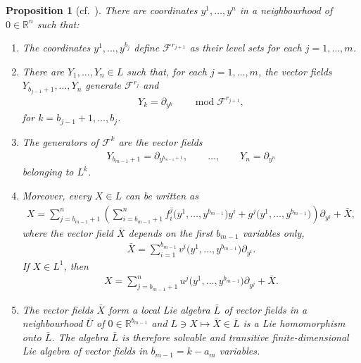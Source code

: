 \documentclass[pdftex]{sigma}
\numberwithin{equation}{section}
\newtheorem{Proposition}[Theorem]{Proposition}
 { \theoremstyle{definition}
\newtheorem{Definition}[Theorem]{Definition}
\newtheorem{Example}[Theorem]{Example}
\newtheorem{Remark}[Theorem]{Remark} }
\begin{document}
\begin{Proposition}[cf.~\cite{CFG16, CFGR15}]\label{p1}
There are coordinates $y^1,\dots,y^n$ in a neighbourhood of $0\in{\mathbb R}^n$ such that:
\begin{enumerate}\itemsep=0pt
\item[$1.$] The coordinates $y^1,\dots, y^{b_j}$ define ${\mathcal F}^{r_{j+1}}$ as their level sets for each $j=1,\dots,m$.
\item[$2.$] There are $Y_1,\dots,Y_n\in L$ such that, for each $j=1,\dots,m$, the vector fields $Y_{b_{j-1}+1},\dots,Y_n$ generate ${\mathcal F}^{r_j}$ and
\begin{gather}\label{gen} Y_k=\partial_{y^k} \qquad \operatorname{mod}{\mathcal F}^{r_{j+1}} ,\end{gather}
for $k=b_{j-1}+1,\dots,b_j$.
\item[$3.$] The generators of ${\mathcal F}^k$ are the vector fields
\begin{gather}\label{fine} Y_{b_{m-1}+1}=\partial_{y^{b_{m-1}+1}} ,\qquad \dots,\qquad Y_n=\partial_{y^n}\end{gather}
belonging to $L^k$.
\item[$4.$] Moreover, every $X\in L$ can be written as
\begin{gather}\label{form}X=\sum_{j=b_{m-1}+1}^n\left(\sum_{i=b_{m-1}+1}^n f_i^j\big(y^1,\dots,y^{b_{m-1}}\big)y^i+g^j\big(y^1,\dots,y^{b_{m-1}}\big)\right)\partial_{y^j}
+\bar{X} ,
\end{gather}
where the vector field $\bar{X}$ depends on the first $b_{m-1}$ variables only,
\begin{gather*}%
\bar{X}=\sum_{i=1}^{b_{m-1}}v^i\big(y^1,\dots,y^{b_{m-1}}\big)\partial_{y^i} .\end{gather*}
If $X\in L^1$, then
\begin{gather*}%
X=\sum_{j=b_{m-1}+1}^nu^j\big(y^1,\dots,y^{b_{m-1}}\big)\partial_{y^j}
+\bar{X} .
\end{gather*}

\item[$5.$] The vector fields $\bar{X}$ form a local Lie algebra $\bar{L}$ of vector fields in a neighbourhood $\bar{U}$
of $0\in{\mathbb R}^{b_{m-1}}$ and $L\ni X\mapsto \bar{X}\in\overline{L}$ is a Lie homomorphism onto $\bar{L}$. The algebra $\bar{L}$ is therefore solvable and transitive finite-dimensional Lie algebra of vector fields in $b_{m-1}=k-a_m$ variables.
\end{enumerate}
\end{Proposition}
\end{document}
